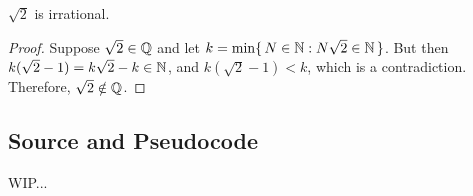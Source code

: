 \begin{thm}
  \(\sqrt{2}\) is irrational.
\end{thm}
%
\begin{proof}
  Suppose \(\sqrt{2} \in \mathbb{Q}\) and let \(k = \min\{\, N \in \mathbb{N} : N\sqrt{2} \in \mathbb{N} \,\}\).
  But then \(k (\sqrt{2} - 1) = k\sqrt{2} - k \in \mathbb{N}\), and \(k(\sqrt{2} - 1) < k\), which is a contradiction.
  Therefore, \(\sqrt{2} \notin \mathbb{Q}\).
\end{proof}


\subsection{Source and Pseudocode}
\label{sec:code}

WIP...